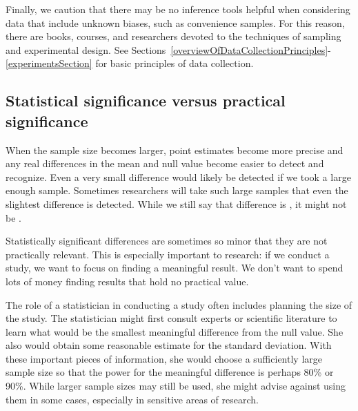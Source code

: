 Finally, we caution that there may be no inference tools helpful when considering data that include unknown biases, such as convenience samples. For this reason, there are books, courses, and researchers devoted to the techniques of sampling and experimental design. See Sections~\ref{overviewOfDataCollectionPrinciples}-\ref{experimentsSection} for basic principles of data collection.


\subsection{Statistical significance versus practical significance}

When the sample size becomes larger, point estimates become more precise and any real differences in the mean and null value become easier to detect and recognize. Even a very small difference would likely be detected if we took a large enough sample. Sometimes researchers will take such large samples that even the slightest difference is detected. While we still say that difference is , it might not be .

Statistically significant differences are sometimes so minor that they are not practically relevant. This is especially important to research: if we conduct a study, we want to focus on finding a meaningful result. We don't want to spend lots of money finding results that hold no practical value.

The role of a statistician in conducting a study often includes planning the size of the study. The statistician might first consult experts or scientific literature to learn what would be the smallest meaningful difference from the null value. She also would obtain some reasonable estimate for the standard deviation. With these important pieces of information, she would choose a sufficiently large sample size so that the power for the meaningful difference is perhaps 80\% or 90\%. While larger sample sizes may still be used, she might advise against using them in some cases, especially in sensitive areas of research.



